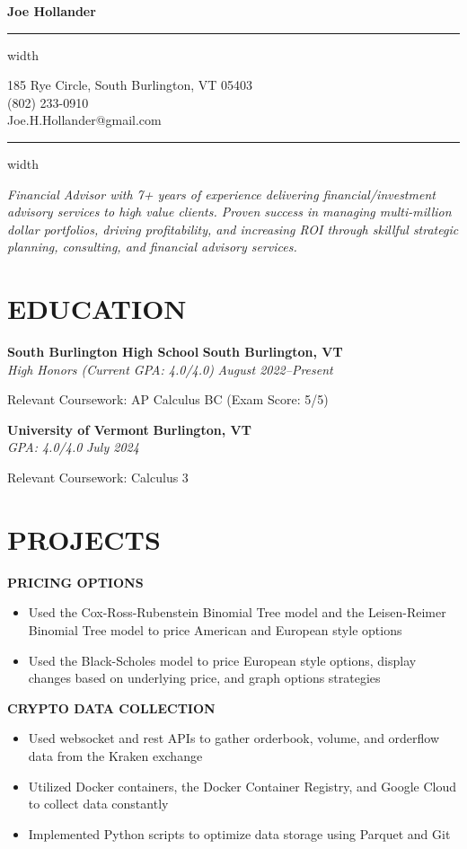\documentclass[11pt,letterpaper]{article}
\newcommand{\name}[1]{
  \begin{center}
    \Huge\textbf{#1}
  \end{center}
  \vspace{-0.5em}
  \hrule height 0.4pt width \textwidth
  \vspace{0.5em}
}
\newcommand{\contact}[3]{
  \begin{center}
    #1 \\
    #2 \\
    #3
  \end{center}
  \vspace{-0.5em}
  \hrule height 0.4pt width \textwidth
  \vspace{0.5em}
}
\newcommand{\role}[4]{
  \begin{center}
  \textbf{#1} \hfill \textbf{#2} \\
  \textit{#3} \hfill \textit{#4}
  \end{center}
}
\begin{document}
\name{Joe Hollander}
\vspace{-0.5em}
\contact{185 Rye Circle, South Burlington, VT 05403}{(802) 233-0910}{Joe.H.Hollander@gmail.com}

\vspace{-0.5em}
\begin{center}
\textit{Financial Advisor with 7+ years of experience delivering financial/investment advisory services to high value clients. Proven success in managing multi-million dollar portfolios, driving profitability, and increasing ROI through skillful strategic planning, consulting, and financial advisory services.}
\end{center}

\section{EDUCATION}

\vspace{0.5em}
\role{South Burlington High School}{South Burlington, VT}{High Honors (Current GPA: 4.0/4.0)}{August 2022--Present}   
\begin{flushleft}
Relevant Coursework: AP Calculus BC (Exam Score: 5/5)
\end{flushleft}

\role{University of Vermont}{Burlington, VT}{GPA: 4.0/4.0}{July 2024}
\begin{flushleft}
  Relevant Coursework: Calculus 3
  \end{flushleft}

\section{PROJECTS}
\vspace{1em}
\begin{flushleft}
  \textbf{PRICING OPTIONS}
  \begin{itemize}[leftmargin=*,nosep]
    \item Used the Cox-Ross-Rubenstein Binomial Tree model and the Leisen-Reimer Binomial Tree model to price American and European style options
    \item Used the Black-Scholes model to price European style options, display changes based on underlying price, and graph options strategies
  \end{itemize}
\end{flushleft}


\begin{flushleft}
  \textbf{CRYPTO DATA COLLECTION}
  \begin{itemize}[leftmargin=*,nosep]
    \item Used websocket and rest APIs to gather orderbook, volume, and orderflow data from the Kraken exchange
    \item Utilized Docker containers, the Docker Container Registry, and Google Cloud to collect data constantly
    \item Implemented Python scripts to optimize data storage using Parquet and Git
  \end{itemize}
\end{flushleft}
\end{document}
